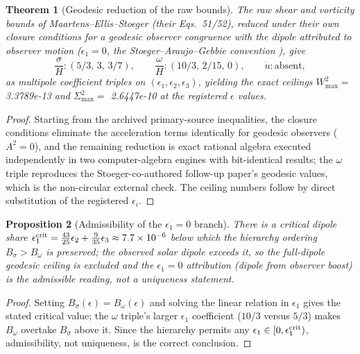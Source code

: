 \documentclass[10pt]{article}
\newtheorem{theorem}{Theorem}[section]
\newtheorem{proposition}[theorem]{Proposition}
\theoremstyle{definition}
\begin{document}
\begin{theorem}[Geodesic reduction of the raw bounds]
\label{thm:mes}
The raw shear and vorticity bounds of Maartens--Ellis--Stoeger
\cite{MES1995} (their Eqs.~51/52), reduced under their own closure
conditions for a geodesic observer congruence with the dipole
attributed to observer motion ($\epsilon_1 = 0$, the
Stoeger--Araujo--Gebbie convention \cite{SAG1997}), give
\begin{equation}
\frac{\sigma}{H}: (5/3,\, 3,\, 3/7), \qquad
\frac{\omega}{H}: (10/3,\, 2/15,\, 0), \qquad
\dot u : \text{absent},
\end{equation}
as multipole coefficient triples on $(\epsilon_1, \epsilon_2,
\epsilon_3)$, yielding the exact ceilings
$W^2_{\max} = $ 3.3789e-13 and $\Sigma^2_{\max} = $ 2.6447e-10 at the
registered $\epsilon$ values.
\end{theorem}
\begin{proof}
Starting from the archived primary-source inequalities, the closure
conditions eliminate the acceleration terms identically for geodesic
observers ($A^2 = 0$), and the remaining reduction is exact rational
algebra executed independently in two computer-algebra engines with
bit-identical results; the $\omega$ triple reproduces the
Stoeger-co-authored follow-up paper's geodesic values, which is the
non-circular external check. The ceiling numbers follow by direct
substitution of the registered $\epsilon_i$.
\end{proof}

\begin{proposition}[Admissibility of the $\epsilon_1 = 0$ branch]
There is a critical dipole share $\epsilon_1^{\rm crit} =
\tfrac{43}{25}\epsilon_2 + \tfrac{9}{35}\epsilon_3 \approx 7.7\times
10^{-6}$ below which the hierarchy ordering $B_\sigma > B_\omega$ is
preserved; the observed solar dipole exceeds it, so the full-dipole
geodesic ceiling is excluded and the $\epsilon_1 = 0$ attribution
(dipole from observer boost) is the admissible reading, not a
uniqueness statement.
\end{proposition}
\begin{proof}
Setting $B_\sigma(\epsilon) = B_\omega(\epsilon)$ and solving the
linear relation in $\epsilon_1$ gives the stated critical value; the
$\omega$ triple's larger $\epsilon_1$ coefficient ($10/3$ versus
$5/3$) makes $B_\omega$ overtake $B_\sigma$ above it. Since the
hierarchy permits any $\epsilon_1 \in [0, \epsilon_1^{\rm crit})$,
admissibility, not uniqueness, is the correct conclusion.
\end{proof}
\end{document}
